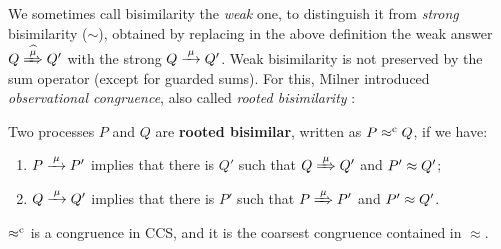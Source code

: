 We sometimes call bisimilarity the \emph{weak} one, to
distinguish it from \emph{strong} bisimilarity ($\sim$),
obtained by replacing in the above definition   the weak answer $
Q\Arcap\mu Q'$ with the strong  $Q \arr \mu Q'$.
Weak bisimilarity is not preserved by the sum operator (except for
guarded sums). For this, Milner introduced \emph{observational congruence}, also called \emph{rooted
  bisimilarity} \cite{Gorrieri:2015jt,Sangiorgi:2011ut}:
\begin{definition}%
\label{d:rootedBisimilarity}
Two processes $P$ and $Q$ are \textbf{rooted bisimilar}, written as $P
\mathrel{\approx^{\rm{c}}} Q$, if we have:
\begin{enumerate}
 \item  $P \arr\mu P'$ implies that there is $Q'$ such that $Q
   \Arr\mu Q'$ and $P' \approx Q'$;
 \item  $Q \arr\mu Q'$ implies that there is $P'$ such that $P
   \Arr\mu P'$ and $P' \approx Q'$\enspace.
\end{enumerate}
\end{definition}

\begin{theorem}
\label{t:rapproxCongruence}
$\mathrel{\approx^{\rm{c}}}$ is a congruence in CCS, and it is the
coarsest congruence contained in $\approx$.
\end{theorem}


